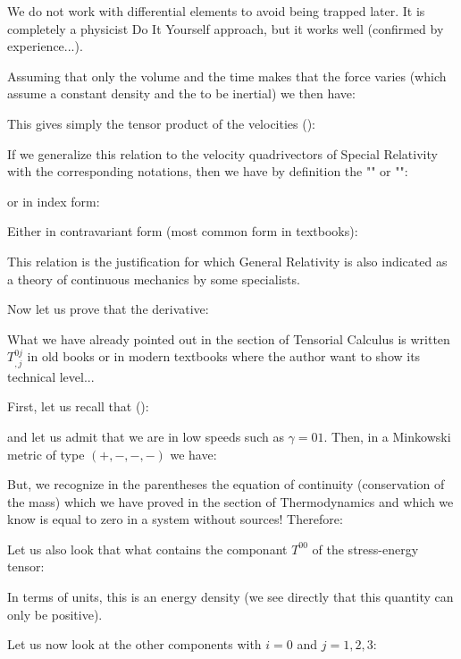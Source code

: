 	\begin{tcolorbox}[title=Remark,colframe=black,arc=10pt]
	We do not work with differential elements to avoid being trapped later. It is completely a physicist Do It Yourself approach, but it works well (confirmed by experience...).
	\end{tcolorbox}
	Assuming that only the volume and the time makes that the force varies (which assume a constant density and the to be inertial) we then have:
	
	This gives simply the tensor product of the velocities ():
	
	If we generalize this relation to the velocity quadrivectors of Special Relativity with the corresponding notations, then we have by definition the "" or "":
	
	or in index form:
	
	Either in contravariant form (most common form in textbooks):
	
	This relation is the justification for which General Relativity is also indicated as a theory of continuous mechanics by some specialists.

	Now let us prove that the derivative:
	
	\begin{tcolorbox}[title=Remark,colframe=black,arc=10pt]
	What we have already pointed out in the section of Tensorial Calculus is written $T^{0j}_{,j}$ in old books or in modern textbooks where the author want to show its technical level...
	\end{tcolorbox}	
	First, let us recall that ():
	
	and let us admit that we are in low speeds such as $\gamma=01$. Then, in a Minkowski metric of type $(+, -, -, -)$ we have:
	
	But, we recognize in the parentheses the equation of continuity (conservation of the mass) which we have proved in the section of Thermodynamics and which we know is equal to zero in a system without sources! Therefore:
	
	Let us also look that what contains the componant $T^{00}$ of the stress-energy tensor:
	
	In terms of units, this is an energy density (we see directly that this quantity can only be positive).

	Let us now look at the other components with $i=0$ and $j=1,2,3$:
	
